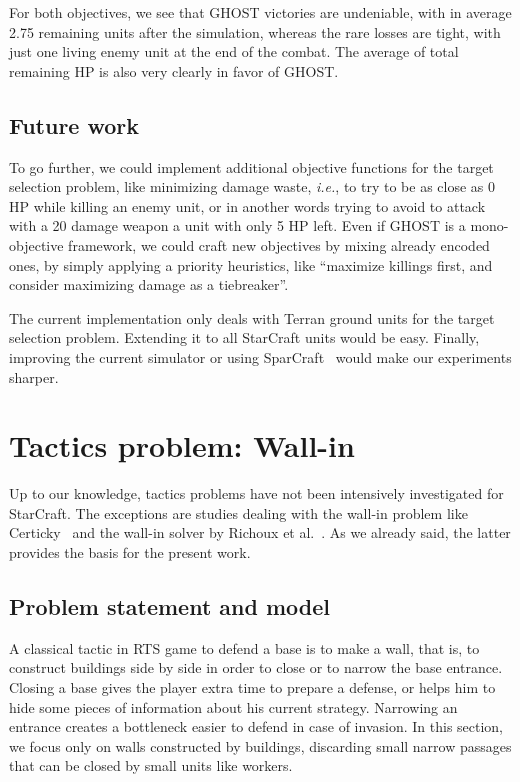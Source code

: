 \documentclass[journal]{IEEEtran}
\newcommand{\minormod}[1]{\color{red} #1\color{black} \xspace}
\newcommand{\ghost}{\textsc{GHOST}\xspace}
\newcommand{\ie}{\textit{i.e.}}
\begin{document}
For both objectives, we see that \ghost victories are undeniable, with
in average \minormod{2.75} remaining units after the simulation, whereas the rare
losses are tight, with just one living enemy unit at the end of the
combat. The average of total remaining HP is also very clearly in
favor of \ghost.

\subsection{Future work}

To go further,  we could implement additional  objective functions for
the target  selection problem, like  minimizing damage waste,  \ie, to
try to  be as close  as 0  HP while killing  an enemy unit, or in another
words trying to avoid to attack with a 20 damage weapon a unit with only 5 HP left.   Even if
\ghost is  a mono-objective framework,  we could craft new  objectives by
mixing already encoded ones, by simply applying a priority heuristics,
like ``maximize  killings first, and  consider maximizing damage  as a
tiebreaker''.

The current implementation only deals  with Terran ground units for the
target selection problem.   Extending it to all  StarCraft units would
be easy. Finally,  improving the current simulator  or using SparCraft~\cite{churchill2013sparcraft}
would make our experiments sharper.

\section{Tactics problem: Wall-in}\label{sec:wall}

Up  to  our  knowledge,  tactics  problems  have  not  been  intensively
investigated for StarCraft.
The exceptions are studies dealing with the wall-in problem like
Certicky~\cite{Certicky13} and the wall-in solver by Richoux et
al.~\cite{RichouxUO14}. As we already said, the latter provides the
basis for the present work.

\subsection{Problem statement and model}

A classical tactic in RTS game to defend a base is to make a wall, that is,
to construct buildings side by side in order to close or to narrow the
base entrance. Closing a base gives the player extra time to prepare a
defense, or  helps him to  hide some  pieces of information  about his
current strategy. Narrowing an entrance creates a bottleneck easier to
defend in  case of  invasion. In  this section, we  focus  only on
walls constructed by buildings,  discarding small narrow passages that
can be closed by small units like workers.
\end{document}
